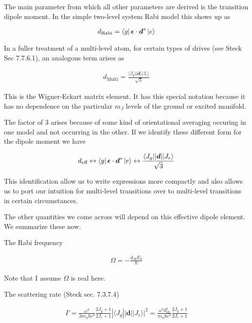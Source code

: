 \documentclass[12pt]{article}
\newcommand{\bv}[1]{\boldsymbol{#1}}
\begin{document}
The main parameter from which all other parameters are derived is the transition dipole moment. In the simple two-level system Rabi model this shows up as

\begin{align}
d_{\text{Rabi}} = \bra{g}\bv{\epsilon}\cdot \bv{d}^*\ket{e}
\end{align}

In a fuller treatment of a multi-level atom, for certain types of drives (see Steck Sec 7.7.6.1), an analogous term arises as

\begin{align}
d_{\text{Multi}} = \frac{{\langle J_g}||\bv{d}||J_e\rangle }{\sqrt{3}}
\end{align}

This is the Wigner-Eckart matrix element. It has this special notation because it has no dependence on the particular $m_J$ levels of the ground or excited manifold.

The factor of 3 arises because of some kind of orientational averaging occuring in one model and not occurring in the other. If we identify these different form for the dipole moment we have

\begin{align}
d_{\text{eff}} \leftrightarrow \bra{g}\bv{\epsilon}\cdot \bv{d}^*\ket{e} \leftrightarrow \frac{\langle J_g||\bv{d}|| J_e\rangle}{\sqrt{3}}
\end{align}

This identification allow us to write expressions more compactly and also allows us to port our intuition for multi-level transitions over to multi-level transitions in certain circumstances.

The other quantities we come across will depend on this effective dipole element. We summarize these now.

The Rabi frequency

\begin{align}
\Omega = -\frac{d_{\text{eff}}E_0}{\hbar}
\end{align}

Note that I assume $\Omega$ is real here.

The scattering rate (Steck sec. 7.3.7.4)

\begin{align}
\Gamma = \frac{\omega^3}{3\pi \epsilon_0 \hbar c^3} \frac{2J_g+1}{2J_e+1} |\langle J_g||\bv{d}|| J_e\rangle|^2 = \frac{\omega^3 d_{\text{eff}}^2}{\pi\epsilon_0 \hbar c^3}\frac{2J_g+1}{2J_e+1}
\end{align}
\end{document}
